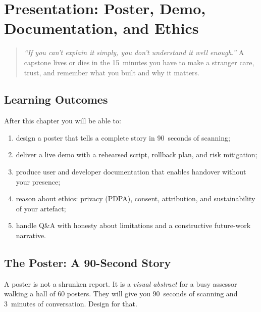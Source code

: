 \chapter{Presentation: Poster, Demo, Documentation, and Ethics}
\label{ch:presentation}

\begin{quote}
\emph{``If you can't explain it simply, you don't understand it well enough.''} A capstone lives or dies in the 15~minutes you have to make a stranger care, trust, and remember what you built and why it matters.
\end{quote}

\noindent{}

\vspace{0.4em}

\section*{Learning Outcomes}
After this chapter you will be able to:
\begin{enumerate}[label=(L\arabic*)]
    \item design a poster that tells a complete story in 90~seconds of scanning;
    \item deliver a live demo with a rehearsed script, rollback plan, and risk mitigation;
    \item produce user and developer documentation that enables handover without your presence;
    \item reason about ethics: privacy (PDPA), consent, attribution, and sustainability of your artefact;
    \item handle Q\&A with honesty about limitations and a constructive future-work narrative.
\end{enumerate}

\section{The Poster: A 90-Second Story}
\label{sec:poster}

A poster is not a shrunken report. It is a \emph{visual abstract} for a busy assessor walking a hall of 60 posters. They will give you 90~seconds of scanning and 3~minutes of conversation. Design for that.

